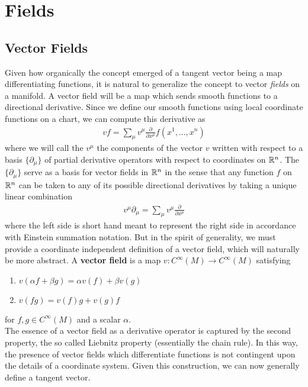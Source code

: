 \section*{Fields}
\subsection*{Vector Fields}
Given how organically the concept emerged of a tangent vector  being a map differentiating functions, it is natural to generalize the concept to vector \textit{fields} on a manifold.   A vector field will be a map which sends smooth functions to a directional derivative.  Since we define our smooth functions using local coordinate functions on a chart, we can compute this derivative as
\begin{align*}
	vf = \sum\limits_\mu v^\mu \frac{\partial}{\partial x^\mu}f(x^1, ..., x^n)
\end{align*} 
where we will call the $v^\mu$ the components of the vector $v$ written with respect to a basis $\{\partial_\mu \}$ of partial derivative operators with respect to coordinates on $\mathbb{R}^n$.  The $\{\partial_\mu\}$ serve as a basis for vector fields in $\mathbb{R}^n$ in the sense that any function $f$ on $\mathbb{R}^n$ can be taken to any of its possible directional derivatives by taking a unique linear combination 
\begin{align*}
	v^\mu\partial_\mu = \sum\limits_\mu v^\mu \frac{\partial}{\partial x^\mu}
\end{align*}
where the left side is short hand meant to represent the right side in accordance with Einstein summation notation.  But in the spirit of generality, we must provide a coordinate independent definition of a vector field, which will naturally be more abstract.  A \textbf{vector field} is a map $v: C^\infty(M) \to C^\infty(M)$ satisfying 
\begin{enumerate}
	\item $v(\alpha f+\beta g) = \alpha v(f)+\beta v(g)$
	\item $v(fg) = v(f)g+v(g)f$
\end{enumerate}
for $f, g \in C^\infty(M)$ and a scalar $\alpha$.\\

The essence of a vector field as a derivative operator is captured by the second property, the so called Liebnitz property (essentially the chain rule).  In this way, the presence of vector fields which differentiate functions is not contingent upon the details of a coordinate system.  Given this construction, we can now generally define a tangent vector.\\

